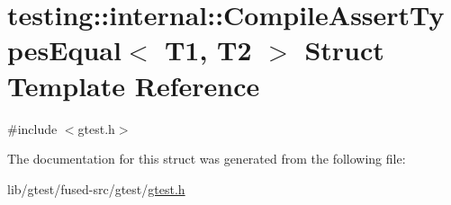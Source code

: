 \hypertarget{structtesting_1_1internal_1_1_compile_assert_types_equal}{\section{testing\-:\-:internal\-:\-:Compile\-Assert\-Types\-Equal$<$ T1, T2 $>$ Struct Template Reference}
\label{structtesting_1_1internal_1_1_compile_assert_types_equal}
}


{\ttfamily \#include $<$gtest.\-h$>$}



The documentation for this struct was generated from the following file\-:\begin{DoxyCompactItemize}
\item 
lib/gtest/fused-\/src/gtest/\hyperlink{fused-src_2gtest_2gtest_8h}{gtest.\-h}\end{DoxyCompactItemize}
